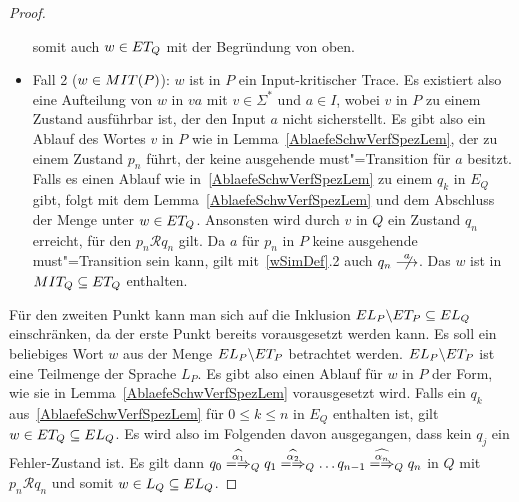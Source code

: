 \begin{proof}
\begin{itemize}
      somit auch $w\in ET _Q$ mit der Begründung von oben.
    \item Fall 2 ($w\in MIT (P)$): $w$ ist in $P$ ein Input-kritischer Trace.
      Es existiert also eine Aufteilung von $w$ in $va$ mit $v\in \Sigma ^*$
      und $a\in I$, wobei $v$ in $P$ zu einem Zustand ausführbar ist, der den
      Input $a$ nicht sicherstellt. Es gibt also ein Ablauf des Wortes $v$ in
      $P$ wie in Lemma~\ref{AblaefeSchwVerfSpezLem}, der zu einem Zustand $p_n$
      führt, der keine ausgehende must"=Transition für $a$ besitzt. Falls es
      einen Ablauf wie in~\ref{AblaefeSchwVerfSpezLem} zu einem $q_k$ in $E_Q$
      gibt, folgt mit dem Lemma~\ref{AblaefeSchwVerfSpezLem} und dem Abschluss
      der Menge \ET{} unter \cont{} $w\in ET _Q$. Ansonsten wird durch $v$ in
      $Q$ ein Zustand $q_n$ erreicht, für den $p_n\mathcal{R} q_n$ gilt. Da $a$
      für $p_n$ in $P$ keine ausgehende must"=Transition sein kann, gilt
      mit~\ref{wSimDef}.2 auch $q_n \nmust[a]$. Das $w$ ist in $MIT _Q
      \subseteq ET _Q$ enthalten.
  \end{itemize}
  Für den zweiten Punkt kann man sich auf die Inklusion $EL _P\backslash ET _P
  \subseteq EL _Q$ einschränken, da der erste Punkt bereits vorausgesetzt
  werden kann. Es soll ein beliebiges Wort $w$ aus der Menge $EL
  _P\backslash ET _P$ betrachtet werden. $EL _P\backslash ET _P$ ist eine
  Teilmenge der Sprache $L _P$. Es gibt also einen Ablauf für $w$ in $P$ der
  Form, wie sie in Lemma~\ref{AblaefeSchwVerfSpezLem} vorausgesetzt wird. Falls
  ein $q_k$ aus~\ref{AblaefeSchwVerfSpezLem} für $0 \leq k \leq n$ in $E_Q$
  enthalten ist, gilt $w\in ET _Q \subseteq EL _Q$. Es wird also im Folgenden
  davon ausgegangen, dass kein $q_j$ ein Fehler-Zustand ist. Es gilt dann $q_0
  \weakmay[\widehat{\alpha _1}]_Q q_1 \weakmay[\widehat{\alpha _2}]_Q \dots
  q_{n-1} \weakmay[\widehat{\alpha _n}]_Q q_n$ in $Q$ mit $p_n \mathcal{R} q_n$
  und somit $w\in L _Q\subseteq EL _Q$.


\end{proof}
